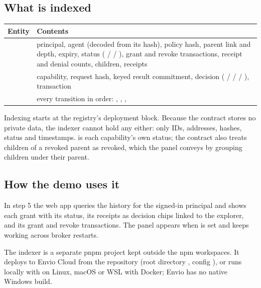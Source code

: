 \documentclass[11pt,a4paper]{article}
\begin{document}
\subsection{What is indexed}
\begin{center}
\renewcommand{\arraystretch}{1.3}
\small
\begin{tabularx}{\textwidth}{@{}l Y@{}}
\toprule
\textbf{Entity} & \textbf{Contents}\\
\midrule
{} & principal, agent (decoded from its  hash), policy hash, parent link and depth, expiry, status ( /  / ), grant and revoke transactions, receipt and denial counts, children, receipts\\
 & capability, request hash, keyed result commitment, decision ( /  /  / ), transaction\\
 & every transition in order: , , , \\
\bottomrule
\end{tabularx}
\end{center}

Indexing starts at the registry's deployment block. Because the contract stores no private data, the indexer cannot hold any either: only IDs, addresses, hashes, status and timestamps.  is each capability's own status; the contract also treats children of a revoked parent as revoked, which the panel conveys by grouping children under their parent.

\subsection{How the demo uses it}
In step 5 the web app queries the history for the signed-in principal and shows each grant with its status, its receipts as decision chips linked to the explorer, and its grant and revoke transactions. The panel appears when  is set and keeps working across broker restarts.

The indexer is a separate pnpm project kept outside the npm workspaces. It deploys to Envio Cloud from the repository (root directory , config ), or runs locally with  on Linux, macOS or WSL with Docker; Envio has no native Windows build.

\end{document}
